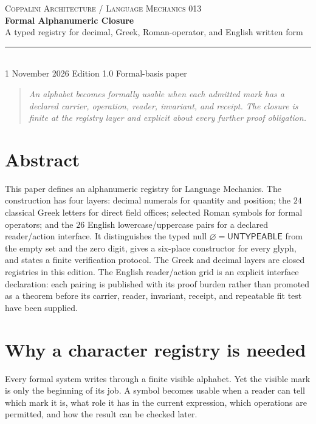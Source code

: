 \documentclass[11pt]{article}
\begin{document}
\begin{center}
{\small\scshape Coppalini Architecture \quad / \quad Language Mechanics 013}\\[2.3em]
{\LARGE\bfseries Formal Alphanumeric Closure}\\[1em]
{\large A typed registry for decimal, Greek, Roman-operator, and English written form}\\[2em]
\rule{0.8\textwidth}{0.45pt}\\[1.2em]
{\small 1 November 2026 \quad \textbullet\quad Edition 1.0 \quad \textbullet\quad Formal-basis paper}
\end{center}

\vspace{1.1em}
\begin{quote}\itshape
An alphabet becomes formally usable when each admitted mark has a declared carrier, operation, reader, invariant, and receipt. The closure is finite at the registry layer and explicit about every further proof obligation.
\end{quote}

\section*{Abstract}
This paper defines an alphanumeric registry for Language Mechanics. The construction has four layers: decimal numerals for quantity and position; the $24$ classical Greek letters for direct field offices; selected Roman symbols for formal operators; and the $26$ English lowercase/uppercase pairs for a declared reader/action interface. It distinguishes the typed null $\varnothing=\mathsf{UNTYPEABLE}$ from the empty set and the zero digit, gives a six-place constructor for every glyph, and states a finite verification protocol. The Greek and decimal layers are closed registries in this edition. The English reader/action grid is an explicit interface declaration: each pairing is published with its proof burden rather than promoted as a theorem before its carrier, reader, invariant, receipt, and repeatable fit test have been supplied.

\section{Why a character registry is needed}
Every formal system writes through a finite visible alphabet. Yet the visible mark is only the beginning of its job. A symbol becomes usable when a reader can tell which mark it is, what role it has in the current expression, which operations are permitted, and how the result can be checked later.
\end{document}
